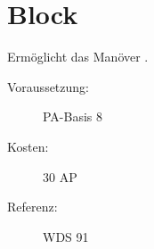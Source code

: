 \section{Block}
\label{sf.block}
Ermöglicht das Manöver .
\begin{description}
    \item[Voraussetzung:]
        PA-Basis 8
    \item [Kosten:]
        30 AP
    \item [Referenz:]
        WDS 91
\end{description}
